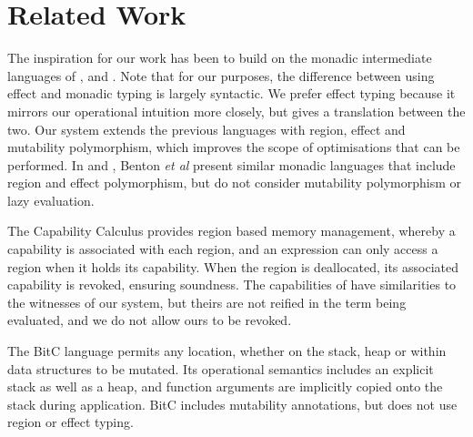 
\clearpage{}
\section{Related Work}

The inspiration for our work has been to build on the monadic intermediate languages of \cite{tolmach:optimizing-ml}, \cite{benton:monads-effects-transformations} and \cite{peyton-jones:bridging-the-gulf}. Note that for our purposes, the difference between using effect and monadic typing is largely syntactic. We prefer effect typing because it mirrors our operational intuition more closely, but \cite{wadler:marriage-2003} gives a translation between the two.  Our system extends the previous languages with region, effect and mutability polymorphism, which improves the scope of optimisations that can be performed. In \cite{benton:relational-semantics-effect-transformations} and \cite{benton:semantics-effect-analysis}, Benton \emph{et al} present similar monadic languages that include region and effect polymorphism, but do not consider mutability polymorphism or lazy evaluation.

The Capability Calculus \cite{crary:capabilities} provides region based memory management, whereby a capability is associated with each region, and an expression can only access a region when it holds its capability. When the region is deallocated, its associated capability is revoked, ensuring soundness. The capabilities of \cite{crary:capabilities} have similarities to the witnesses of our system, but theirs are not reified in the term being evaluated, and we do not allow ours to be revoked.

The BitC \cite{shapiro:bitc-language-specification} language permits any location, whether on the stack, heap or within data structures to be mutated. Its operational semantics includes an explicit stack as well as a heap, and function arguments are implicitly copied onto the stack during application. BitC includes mutability annotations, but does not use region or effect typing. 




